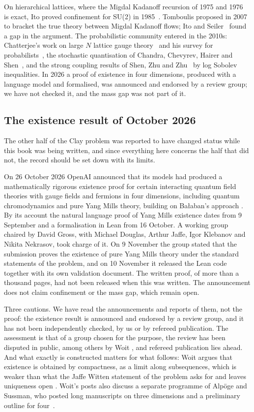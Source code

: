 On hierarchical lattices, where the Migdal Kadanoff recursion of 1975 and 1976~\cite{Mi75,Ka75,Ka76} is exact, Ito proved confinement for SU(2) in 1985~\cite{Ito85}. Tomboulis proposed in 2007~\cite{To07} to bracket the true theory between Migdal Kadanoff flows; Ito and Seiler~\cite{IS} found a gap in the argument. The probabilistic community entered in the 2010s: Chatterjee's work on large $N$ lattice gauge theory~\cite{Ch19so} and his survey for probabilists~\cite{Ch19}, the stochastic quantisation of Chandra, Chevyrev, Hairer and Shen~\cite{CCHS}, and the strong coupling results of Shen, Zhu and Zhu~\cite{SZZ} by log Sobolev inequalities. In 2026 a proof of existence in four dimensions, produced with a language model and formalised, was announced and endorsed by a review group; we have not checked it, and the mass gap was not part of it.

\subsection{The existence result of October 2026}\label{sec:existence2026}

The other half of the Clay problem was reported to have changed status while this book was being written, and since everything here concerns the half that did not, the record should be set down with its limits.

On 26 October 2026 OpenAI announced that its models had produced a mathematically rigorous existence proof for certain interacting quantum field theories with gauge fields and fermions in four dimensions, including quantum chromodynamics and pure Yang Mills theory, building on Ba\l aban's approach \cite{OAI}. By its account the natural language proof of Yang Mills existence dates from 9 September and a formalisation in Lean from 16 October. A working group chaired by David Gross, with Michael Douglas, Arthur Jaffe, Igor Klebanov and Nikita Nekrasov, took charge of it. On 9 November the group stated that the submission proves the existence of pure Yang Mills theory under the standard statements of the problem, and on 10 November it released the Lean code together with its own validation document. The written proof, of more than a thousand pages, had not been released when this was written. The announcement does not claim confinement or the mass gap, which remain open.

Three cautions. We have read the announcements and reports of them, not the proof: the existence result is announced and endorsed by a review group, and it has not been independently checked, by us or by refereed publication. The assessment is that of a group chosen for the purpose, the review has been disputed in public, among others by Woit \cite{Woit26}, and refereed publication lies ahead. And what exactly is constructed matters for what follows: Woit argues that existence is obtained by compactness, as a limit along subsequences, which is weaker than what the Jaffe Witten statement of the problem asks for and leaves uniqueness open \cite{Woit26}. Woit's posts also discuss a separate programme of Alp\"oge and Sussman, who posted long manuscripts on three dimensions and a preliminary outline for four~\cite{Woit26}.

